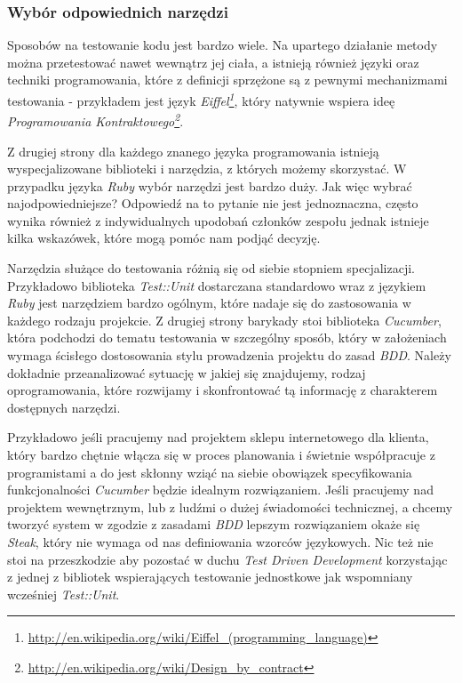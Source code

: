   \subsubsection{Wybór odpowiednich narzędzi}
  Sposobów na testowanie kodu jest bardzo wiele. Na upartego działanie metody można przetestować nawet wewnątrz jej ciała, a istnieją również języki oraz techniki programowania, które z definicji sprzężone są z pewnymi mechanizmami testowania - przykładem jest język \emph{Eiffel\footnote{\url{http://en.wikipedia.org/wiki/Eiffel_(programming_language)}}}, który natywnie wspiera ideę \emph{Programowania Kontraktowego\footnote{\url{http://en.wikipedia.org/wiki/Design_by_contract}}}.
  
  Z drugiej strony dla każdego znanego języka programowania istnieją wyspecjalizowane biblioteki i narzędzia, z których możemy skorzystać. W przypadku języka \emph{Ruby} wybór narzędzi jest bardzo duży. Jak więc wybrać najodpowiedniejsze? Odpowiedź na to pytanie nie jest jednoznaczna, często wynika również z indywidualnych upodobań członków zespołu jednak istnieje kilka wskazówek, które mogą pomóc nam podjąć decyzję.
  
  Narzędzia służące do testowania różnią się od siebie stopniem specjalizacji. Przykładowo biblioteka \emph{Test::Unit} dostarczana standardowo wraz z językiem \emph{Ruby} jest narzędziem bardzo ogólnym, które nadaje się do zastosowania w każdego rodzaju projekcie. Z drugiej strony barykady stoi biblioteka \emph{Cucumber}, która podchodzi do tematu testowania w szczególny sposób, który w założeniach wymaga ścisłego dostosowania stylu prowadzenia projektu do zasad \emph{BDD}. Należy dokładnie przeanalizować sytuację w jakiej się znajdujemy, rodzaj oprogramowania, które rozwijamy i skonfrontować tą informację z charakterem dostępnych narzędzi. 
  
  Przykładowo jeśli pracujemy nad projektem sklepu internetowego dla klienta, który bardzo chętnie włącza się w proces planowania i świetnie współpracuje z programistami a do jest skłonny wziąć na siebie obowiązek specyfikowania funkcjonalności \emph{Cucumber} będzie idealnym rozwiązaniem. Jeśli pracujemy nad projektem wewnętrznym, lub z ludźmi o dużej świadomości technicznej, a chcemy tworzyć system w zgodzie z zasadami \emph{BDD} lepszym rozwiązaniem okaże się \emph{Steak}, który nie wymaga od nas definiowania wzorców językowych. Nic też nie stoi na przeszkodzie aby pozostać w duchu \emph{Test Driven Development} korzystając z jednej z bibliotek wspierających testowanie jednostkowe jak wspomniany wcześniej \emph{Test::Unit}.
  
